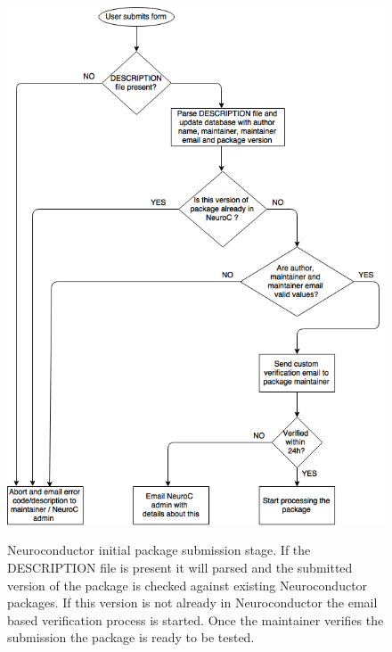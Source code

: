\documentclass[]{elsarticle} %
\begin{document}
\begin{figure}[!ht]
  \begin{center}
    \caption{Neuroconductor initial package submission stage. If the DESCRIPTION file is present it will parsed and the submitted version of the package is checked against existing Neuroconductor packages. If this version is not already in Neuroconductor the email based verification process is started. Once the maintainer verifies the submission the package is ready to be tested.}
    \label{fig:stage1}
    \includegraphics[height=0.9\textheight]{figures/flow_stage1_draft.png}\label{fig:package_lifetime_1}
%
  \end{center}
\end{figure}
\end{document}
